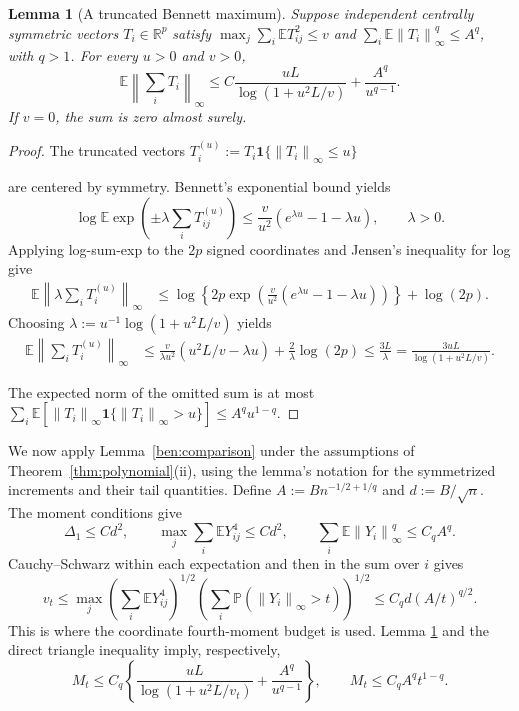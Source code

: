 \documentclass[11pt,letterpaper]{article}
\newenvironment{recovered}{}{}
\newtheorem{lemma}{Lemma}
\theoremstyle{remark}
\newcommand{\E}{\mathbb E}
\newcommand{\Pp}{\mathbb P}
\newcommand{\R}{\mathbb R}
\newcommand{\norm}[1]{\left\lVert#1\right\rVert}
\newcommand{\ind}{\mathbf 1}
\begin{document}
\begin{lemma}[A truncated Bennett maximum]\label{ben:maximum}
Suppose independent centrally symmetric vectors \(T_i\in\R^p\)
satisfy \(\max_j\sum_i\E T_{ij}^2\le v\) and
\(\sum_i\E\norm{T_i}_\infty^q\le A^q\), with \(q>1\).
For every \(u>0\) and \(v>0\),
\begin{equation}
 \E\norm{\sum_iT_i}_\infty
 \le C\frac{uL}{\log(1+u^2L/v)}+\frac{A^q}{u^{q-1}}.
 \label{ben:maximum-bound}
\end{equation}
If \(v=0\), the sum is zero almost surely.
\end{lemma}
\begin{proof}
The truncated vectors \(T_i^{(u)}:=T_i\ind\{\norm{T_i}_\infty\le u\}\)
{
are centered by symmetry. Bennett's exponential bound \cite[Theorem 2.9]{BLM2013} yields
\[
 \log\E\exp\left(\pm\lambda\sum_iT_{ij}^{(u)}\right)
 \le\frac v{u^2}(e^{\lambda u}-1-\lambda u),\qquad\lambda>0.
\]
Applying log-sum-exp to the \(2p\) signed coordinates and Jensen's inequality for log give
\begin{align*}
\E\norm{\lambda\sum_iT_i^{(u)}}_\infty
&\leq\log\left\{2p\exp\left(\frac v{u^2}(e^{\lambda u}-1-\lambda u)\right)\right\}+\log(2p).
\end{align*}
Choosing \(\lambda:=u^{-1}\log(1+u^2L/v)\) yields 
\begin{align*}
\E\norm{\sum_iT_i^{(u)}}_\infty
&\leq\frac v{\lambda u^2}(u^2L/v-\lambda u)+\frac{2}{\lambda}\log(2p)
\leq\frac{3L}{\lambda}=\frac{3uL}{\log(1+u^2L/v)}.
\end{align*}

}
The expected norm of the omitted sum is at most
\(\sum_i\E[\norm{T_i}_\infty\ind\{\norm{T_i}_\infty>u\}]
\le A^qu^{1-q}\).
\end{proof}

\begin{recovered}
We now apply Lemma~\ref{ben:comparison} under the assumptions of
Theorem~\ref{thm:polynomial}\textup{(ii)}, using the lemma's notation for the symmetrized
increments and their tail quantities. {Define}
\(A:=Bn^{-1/2+1/q}\) and \(d:=B/\sqrt n\). The moment conditions give
\end{recovered}
\[
{ \Delta_1\le Cd^2,\qquad
 \max_j\sum_i\E Y_{ij}^4\le Cd^2,\qquad
 \sum_i\E\norm{Y_i}_\infty^q\le C_qA^q.
}
\]
Cauchy--Schwarz within each expectation and then {in the sum over \(i\)} gives
{
\begin{equation}
 v_t\le
 \max_j\left(\sum_i\E Y_{ij}^4\right)^{1/2}
       \left(\sum_i\Pp(\norm{Y_i}_\infty>t)\right)^{1/2}
 \le C_q d(A/t)^{q/2}.
 \label{ben:mixed}
\end{equation}
}
This is where the coordinate fourth-moment budget is used. Lemma
\ref{ben:maximum} and the direct triangle inequality imply, respectively,
{
\begin{equation}
 M_t\le C_q\left\{\frac{uL}{\log(1+u^2L/v_t)}+\frac{A^q}{u^{q-1}}\right\},
 \qquad M_t\le C_q A^qt^{1-q}.
 \label{ben:tail}
\end{equation}
}
\end{document}
